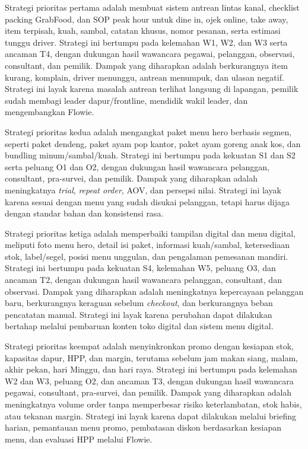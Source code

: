 Strategi prioritas pertama adalah membuat sistem antrean lintas kanal, checklist packing GrabFood, dan SOP peak hour untuk dine in, ojek online, take away, item terpisah, kuah, sambal, catatan khusus, nomor pesanan, serta estimasi tunggu driver. Strategi ini bertumpu pada kelemahan W1, W2, dan W3 serta ancaman T4, dengan dukungan hasil wawancara pegawai, pelanggan, observasi, consultant, dan pemilik. Dampak yang diharapkan adalah berkurangnya item kurang, komplain, driver menunggu, antrean menumpuk, dan ulasan negatif. Strategi ini layak karena masalah antrean terlihat langsung di lapangan, pemilik sudah membagi leader dapur/frontline, mendidik wakil leader, dan mengembangkan Flowie.

Strategi prioritas kedua adalah mengangkat paket menu hero berbasis segmen, seperti paket dendeng, paket ayam pop kantor, paket ayam goreng anak kos, dan bundling minum/sambal/kuah. Strategi ini bertumpu pada kekuatan S1 dan S2 serta peluang O1 dan O2, dengan dukungan hasil wawancara pelanggan, consultant, pra-survei, dan pemilik. Dampak yang diharapkan adalah meningkatnya \textit{trial}, \textit{repeat order}, AOV, dan persepsi nilai. Strategi ini layak karena sesuai dengan menu yang sudah disukai pelanggan, tetapi harus dijaga dengan standar bahan dan konsistensi rasa.

Strategi prioritas ketiga adalah memperbaiki tampilan digital dan menu digital, meliputi foto menu hero, detail isi paket, informasi kuah/sambal, ketersediaan stok, label/segel, posisi menu unggulan, dan pengalaman pemesanan mandiri. Strategi ini bertumpu pada kekuatan S4, kelemahan W5, peluang O3, dan ancaman T2, dengan dukungan hasil wawancara pelanggan, consultant, dan observasi. Dampak yang diharapkan adalah meningkatnya kepercayaan pelanggan baru, berkurangnya keraguan sebelum \textit{checkout}, dan berkurangnya beban pencatatan manual. Strategi ini layak karena perubahan dapat dilakukan bertahap melalui pembaruan konten toko digital dan sistem menu digital.

Strategi prioritas keempat adalah menyinkronkan promo dengan kesiapan stok, kapasitas dapur, HPP, dan margin, terutama sebelum jam makan siang, malam, akhir pekan, hari Minggu, dan hari raya. Strategi ini bertumpu pada kelemahan W2 dan W3, peluang O2, dan ancaman T3, dengan dukungan hasil wawancara pegawai, consultant, pra-survei, dan pemilik. Dampak yang diharapkan adalah meningkatnya volume order tanpa memperbesar risiko keterlambatan, stok habis, atau tekanan margin. Strategi ini layak karena dapat dilakukan melalui briefing harian, pemantauan menu promo, pembatasan diskon berdasarkan kesiapan menu, dan evaluasi HPP melalui Flowie.

